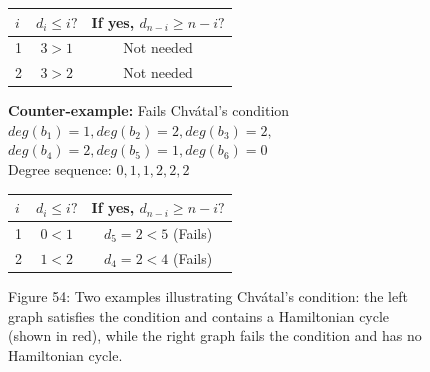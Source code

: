 \documentclass{article}
\theoremstyle{definition}
\def\deg{deg}%
\begin{document}
\begin{figure}[h!]
\begin{center}
\begin{minipage}{0.48\textwidth}
\begin{center}
\begin{tabular}{lcc}
\toprule
$i$ & $d_i \leq i?$ & If yes, $d_{n-i} \geq n-i?$ \\
\midrule
1 & $3 > 1$ & Not needed \\
2 & $3 > 2$ & Not needed \\
\bottomrule
\end{tabular}
\end{center}
\end{minipage}
\hfill
\begin{minipage}{0.48\textwidth}
\centering
{}

\begin{center}
\textbf{Counter-example:} Fails Chvátal's condition\\
\small $\deg(b_1) = 1, \deg(b_2) = 2, \deg(b_3) = 2,$\\
\small $\deg(b_4) = 2, \deg(b_5) = 1, \deg(b_6) = 0$\\
Degree sequence: $0,1,1,2,2,2$

\begin{tabular}{lcc}
\toprule
$i$ & $d_i \leq i?$ & If yes, $d_{n-i} \geq n-i?$ \\
\midrule
1 & $0 < 1$ & $d_5 = 2 < 5$ (Fails) \\
2 & $1 < 2$ & $d_4 = 2 < 4$ (Fails) \\
\bottomrule
\end{tabular}
\end{center}
\end{minipage}
\small Figure 54: {Two examples illustrating Chvátal's condition: the left graph satisfies the condition and contains a Hamiltonian cycle (shown in red), while the right graph fails the condition and has no Hamiltonian cycle.}
\label{fig:53}
\end{center}
\end{figure}
\end{document}
